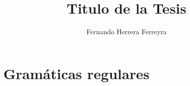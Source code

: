 \documentclass[letterpaper,spanish,12pt]{book}
\author{Fernando Herrera Ferreyra}
\title{Titulo de la Tesis}
\begin{document}
\frontmatter
\maketitle
	
\chapter{Gramáticas regulares}

	
\end{document}
